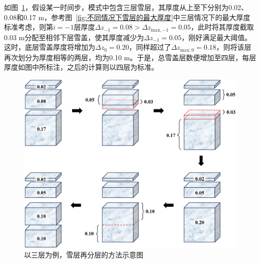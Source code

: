 如图~\ref{fig:以三层为例雪层再分层的方法}，假设某一时间步，模式中包含三层雪层，其厚度从上至下分别为0.02、0.08和0.17 m，参考图~\ref{fig:不同情况下雪层的最大厚度}中三层情况下的最大厚度标准考虑，则第$i=-1$层厚度$\Delta z_{-1}=0.08 > \Delta z_{\mathrm{max,-1}}=0.05 $，此时将其厚度截取0.03 m分配至相邻下层雪盖，使其厚度减少为$\Delta z_{-1}=0.05$，刚好满足最大阈值。这时，底层雪盖厚度将增加为$\Delta z_{0}=0.20$，同样超过了$\Delta z_{\mathrm{max,0}}=0.18$，则将该层再次划分为厚度相等的两层，均为0.10 m。于是，总雪盖层数便增加至四层，每层厚度如图中所标注，之后的计算则以四层为标准。

{
  \begin{figure}[htbp]
    \centering
    \includegraphics[width=0.8\columnwidth]{Figures/雪盖土壤热力过程/以三层为例雪层再分层的方法.png}
    \caption{以三层为例，雪层再分层的方法示意图}
    \label{fig:以三层为例雪层再分层的方法}
  \end{figure}
}
